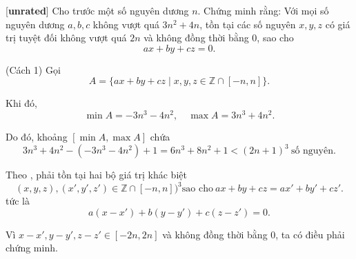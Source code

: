 \documentclass[../01-divisibility.tex]{subfiles}
\begin{document}
\begin{example*}\label{example:CHN-2015-TST1-D2-P5}[\textbf{unrated}]
	Cho trước một số nguyên dương \( n \). Chứng minh rằng: Với mọi số nguyên dương \( a, b, c \) không vượt quá \( 3n^2 + 4n \),
	tồn tại các số nguyên \( x, y, z \) có giá trị tuyệt đối không vượt quá \( 2n \) và không đồng thời bằng 0, sao cho
	\[
		ax + by + cz = 0.
	\]
\end{example*}

\begin{soln}(Cách 1)\footnotemark
	Gọi  
	\[
		A = \{ ax + by + cz \mid x, y, z \in \mathbb{Z} \cap [-n, n] \}.
	\]
	
	Khi đó,  
	\[
		\min A = -3n^3 - 4n^2, \quad \max A = 3n^3 + 4n^2.
	\]
	
	Do đó, khoảng \( [\min A, \max A] \) chứa  
	\[
		3n^3 + 4n^2 - (-3n^3 - 4n^2) + 1 = 6n^3 + 8n^2 + 1 < (2n+1)^3\ \text{số nguyên.}
	\]
	
	Theo , phải tồn tại hai bộ giá trị khác biệt  
	\[
		(x, y, z), (x', y', z') \in \mathbb{Z} \cap [-n, n])^3 \text{sao cho}\ ax + by + cz = ax' + by' + cz'.
	\]
	tức là  
	\[
		a(x - x') + b(y - y') + c(z - z') = 0.
	\]
	
	Vì \( x - x', y - y', z - z' \in [-2n, 2n] \) và không đồng thời bằng 0, ta có điều phải chứng minh.
\end{soln}

\end{document}
